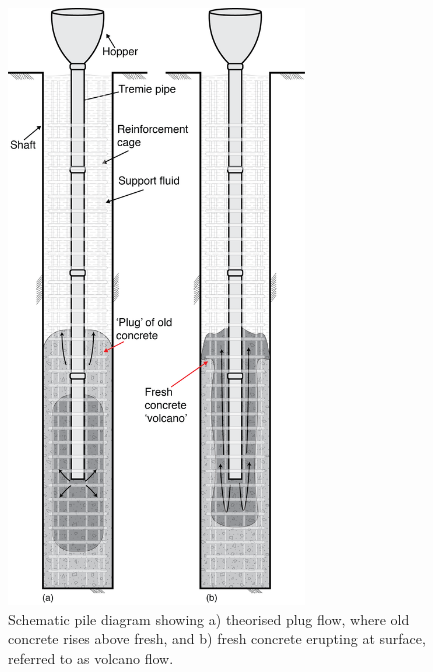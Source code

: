 \begin{figure}[H]
\centering
\includegraphics[width=0.7\textwidth]{flow_pattern_newstyle.png}
\caption{\label{fig:flowpattern}Schematic pile diagram showing a) theorised plug flow, where old concrete rises above fresh, and b) fresh concrete erupting at surface, referred to as volcano flow.}
\end{figure}

